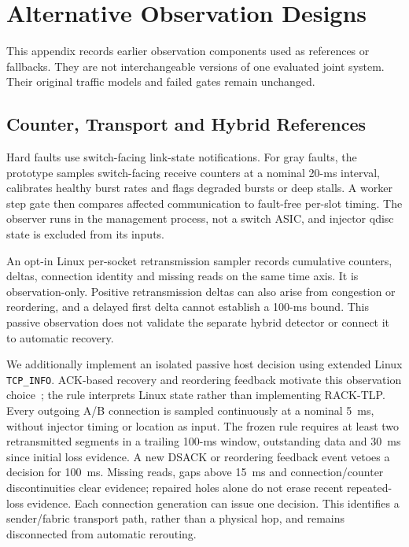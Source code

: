 \documentclass[sigconf]{acmart}
\begin{document}


\appendix

\section{Alternative Observation Designs}
\label{app:observers}
This appendix records earlier observation components used as references or
fallbacks. They are not interchangeable versions of one evaluated joint
system. Their original traffic models and failed gates remain unchanged.

\subsection{Counter, Transport and Hybrid References}
Hard faults use switch-facing link-state notifications. For gray faults,
the prototype samples switch-facing receive counters at a nominal 20-ms
interval, calibrates healthy burst rates and flags degraded bursts or
deep stalls. A worker step gate then compares affected communication to
fault-free per-slot timing. The observer runs in the management process,
not a switch ASIC, and injector qdisc state is excluded from its inputs.

An opt-in Linux per-socket retransmission sampler records cumulative
counters, deltas, connection identity and missing reads on the same time
axis. It is observation-only. Positive retransmission deltas can also
arise from congestion or reordering, and a delayed first delta cannot
establish a 100-ms bound. This passive observation does not validate
the separate hybrid detector or connect it to automatic recovery.


We additionally implement an isolated passive host decision using
extended Linux \texttt{TCP\_INFO}. ACK-based recovery and reordering
feedback motivate this observation choice~\cite{rack2021}; the rule
interprets Linux state rather than implementing RACK-TLP. Every outgoing
A/B connection is sampled continuously at a nominal 5~ms, without
injector timing or location as input. The frozen rule requires at least
two retransmitted segments in a trailing 100-ms window, outstanding
data and 30~ms since initial loss evidence. A new DSACK or reordering
feedback event vetoes a decision for 100~ms. Missing reads, gaps above
15~ms and connection/counter discontinuities clear evidence; repaired
holes alone do not erase recent repeated-loss evidence. Each connection
generation can issue one decision. This identifies a sender/fabric
transport path, rather than a physical hop, and remains disconnected
from automatic rerouting.
\end{document}
